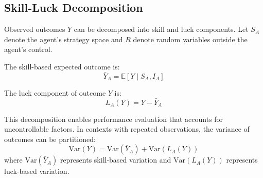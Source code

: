 \subsection{Skill-Luck Decomposition}

Observed outcomes $Y$ can be decomposed into skill and luck components. Let
$S_{A}$ denote the agent's strategy space and $R$ denote random variables
outside the agent's control.

\begin{definition}
  The skill-based expected outcome is:
  \begin{equation}
    \bar{Y}_{A}= \mathbb{E}[Y \mid S_{A}, I_{A}]
  \end{equation}
\end{definition}

\begin{definition}
  The luck component of outcome $Y$ is:
  \begin{equation}
    L_{A}(Y) = Y - \bar{Y}_{A}
  \end{equation}
\end{definition}

This decomposition enables performance evaluation that accounts for uncontrollable
factors. In contexts with repeated observations, the variance of outcomes
can be partitioned:
\begin{equation}
  \text{Var}(Y) = \text{Var}(\bar{Y}_{A}) + \text{Var}(L_{A}(Y))
\end{equation}
where $\text{Var}(\bar{Y}_{A})$ represents skill-based variation and
$\text{Var}(L_{A}(Y))$ represents luck-based variation.

